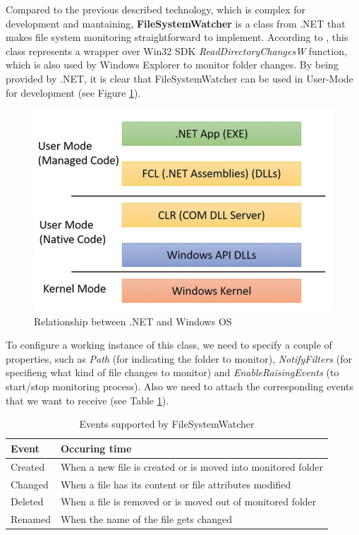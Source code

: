 Compared to the previous described technology, which is complex for development and mantaining, \textbf{FileSystemWatcher} is a class from .NET that makes file system monitoring straightforward to implement. According to \cite{dotNetFramework}, this class represents a wrapper over Win32 SDK \textit{ReadDirectoryChangesW} function, which is also used by Windows Explorer to monitor folder changes. By being provided by .NET, it is clear that FileSystemWatcher can be used in User-Mode for development (see Figure \ref{netFramework}). 

\begin{figure}[H]
	\centerline{\includegraphics[scale=0.5]{figures/NetFramework.png}}  
	\caption{Relationship between .NET and Windows OS \cite{winInternals}}
	\label{netFramework}
\end{figure}

To configure a working instance of this class, we need to specify a couple of properties, such as \textit{Path} (for indicating the folder to monitor), \textit{NotifyFilters} (for specifieng what kind of file changes to monitor) and \textit{EnableRaisingEvents} (to start/stop monitoring process). Also we need to attach the corresponding events that we want to receive (see Table \ref{table:supportedEvents}).

\begin{table}[H]
	\caption{Events supported by FileSystemWatcher}
	\label{table:supportedEvents}
		\centering
            \begin{tabular}{l | l}
                
				\textbf{Event} & \textbf{Occuring time} \\
				\hline 
 				Created & When a new file is created or is moved into monitored folder \\
 				Changed & When a file has its content or file attributes modified \\
 				Deleted & When a file is removed or is moved out of monitored folder \\
                Renamed & When the name of the file gets changed \\
                 
			\end{tabular}
\end{table}

